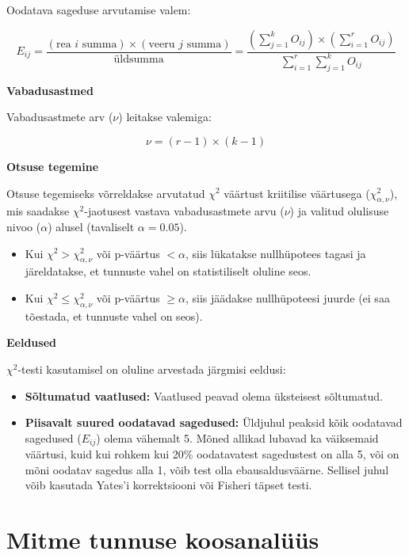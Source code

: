 \documentclass[
]{book}
\providecommand{\tightlist}{%
  \setlength{\itemsep}{0pt}\setlength{\parskip}{0pt}}
\theoremstyle{definition}
\theoremstyle{definition}
\theoremstyle{definition}
\theoremstyle{definition}
\theoremstyle{remark}
\begin{document}
Oodatava sageduse arvutamise valem:

\[
E_{ij} = \frac{(\text{rea } i \text{ summa}) \times (\text{veeru } j \text{ summa})}{\text{üldsumma}} = \frac{(\sum_{j=1}^{k} O_{ij}) \times (\sum_{i=1}^{r} O_{ij})}{\sum_{i=1}^{r} \sum_{j=1}^{k} O_{ij}}
\]

\textbf{Vabadusastmed}

Vabadusastmete arv (\(\nu\)) leitakse valemiga:

\[\nu = (r - 1) \times (k - 1)\]

\textbf{Otsuse tegemine}

Otsuse tegemiseks võrreldakse arvutatud \(\chi^2\) väärtust kriitilise väärtusega (\(\chi^2_{\alpha, \nu}\)), mis saadakse \(\chi^2\)-jaotusest vastava vabadusastmete arvu (\(\nu\)) ja valitud olulisuse nivoo (\(\alpha\)) alusel (tavaliselt \(\alpha = 0.05\)).

\begin{itemize}
\tightlist
\item
  Kui \(\chi^2 > \chi^2_{\alpha, \nu}\) või p-väärtus \(< \alpha\), siis lükatakse nullhüpotees tagasi ja järeldatakse, et tunnuste vahel on statistiliselt oluline seos.
\item
  Kui \(\chi^2 \leq \chi^2_{\alpha, \nu}\) või p-väärtus \(\geq \alpha\), siis jäädakse nullhüpoteesi juurde (ei saa tõestada, et tunnuste vahel on seos).
\end{itemize}

\textbf{Eeldused}

\(\chi^2\)-testi kasutamisel on oluline arvestada järgmisi eeldusi:

\begin{itemize}
\tightlist
\item
  \textbf{Sõltumatud vaatlused:} Vaatlused peavad olema üksteisest sõltumatud.
\item
  \textbf{Piisavalt suured oodatavad sagedused:} Üldjuhul peaksid kõik oodatavad sagedused (\(E_{ij}\)) olema vähemalt 5. Mõned allikad lubavad ka väiksemaid väärtusi, kuid kui rohkem kui 20\% oodatavatest sagedustest on alla 5, või on mõni oodatav sagedus alla 1, võib test olla ebausaldusväärne. Sellisel juhul võib kasutada Yates'i korrektsiooni või Fisheri täpset testi.
\end{itemize}

\chapter{Mitme tunnuse koosanalüüs}\label{mitme-tunnuse-koosanaluxfcuxfcs}
\end{document}
